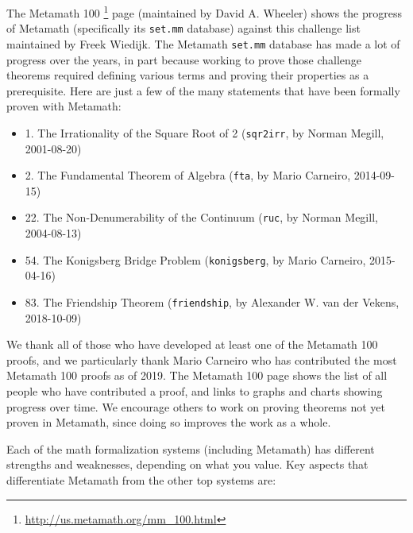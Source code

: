 The Metamath 100%
\footnote{\url{http://us.metamath.org/mm\_100.html}}
page (maintained by David A. Wheeler)
shows the progress of Metamath (specifically its \texttt{set.mm} database)
against this challenge list maintained by Freek Wiedijk.
The Metamath \texttt{set.mm} database
has made a lot of progress over the years,
in part because working to prove those challenge theorems required
defining various terms and proving their properties as a prerequisite.
Here are just a few of the many statements that have been
formally proven with Metamath:

\begin{flushleft}
\begin{itemize}
\item 1. The Irrationality of the Square Root of 2
  (\texttt{sqr2irr}, by Norman Megill, 2001-08-20)
\item 2. The Fundamental Theorem of Algebra
  (\texttt{fta}, by Mario Carneiro, 2014-09-15)
\item 22. The Non-Denumerability of the Continuum
  (\texttt{ruc}, by Norman Megill, 2004-08-13)
\item 54. The Konigsberg Bridge Problem
  (\texttt{konigsberg}, by Mario Carneiro, 2015-04-16)
\item 83. The Friendship Theorem
  (\texttt{friendship}, by Alexander W. van der Vekens, 2018-10-09)
\end{itemize}
\end{flushleft}

We thank all of those who have developed at least one of the Metamath 100
proofs, and we particularly thank
Mario Carneiro
who has contributed the most Metamath 100 proofs as of 2019.
The Metamath 100 page shows the list of all people who have contributed a
proof, and links to graphs and charts showing progress over time.
We encourage others to work on proving theorems not yet proven in Metamath,
since doing so improves the work as a whole.

Each of the math formalization systems (including Metamath)
has different strengths and weaknesses, depending on what you value.
Key aspects that differentiate Metamath from the other top systems are:


